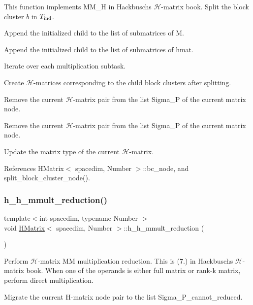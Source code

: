 This function implements {\ttfamily M\+M\+\_\+H} in Hackbusch\textquotesingle{}s $\mathcal{H}$-\/matrix book. Split the block cluster $b$ in $T_{\rm ind}$.

Append the initialized child to the list of submatrices of {\ttfamily M}.

Append the initialized child to the list of submatrices of {\ttfamily hmat}.

Iterate over each multiplication subtask.

Create $\mathcal{H}$-\/matrices corresponding to the child block clusters after splitting.

Remove the current $\mathcal{H}$-\/matrix pair from the list {\ttfamily Sigma\+\_\+P} of the current matrix node.

Remove the current $\mathcal{H}$-\/matrix pair from the list {\ttfamily Sigma\+\_\+P} of the current matrix node.

Update the matrix type of the current $\mathcal{H}$-\/matrix.

References H\+Matrix$<$ spacedim, Number $>$\+::bc\+\_\+node, and split\+\_\+block\+\_\+cluster\+\_\+node().

\mbox{\label{classHMatrix_a168b6eea2e5b27528497850bf5ee2bbe}} 
\subsubsection{\texorpdfstring{h\+\_\+h\+\_\+mmult\+\_\+reduction()}{h\_h\_mmult\_reduction()}}
{\footnotesize\ttfamily template$<$int spacedim, typename Number $>$ \\
void \hyperlink{classHMatrix}{H\+Matrix}$<$ spacedim, Number $>$\+::h\+\_\+h\+\_\+mmult\+\_\+reduction (\begin{DoxyParamCaption}{ }\end{DoxyParamCaption})}

Perform $\mathcal{H}$-\/matrix MM multiplication reduction. This is (7.) in Hackbusch\textquotesingle{}s $\mathcal{H}$-\/matrix book. When one of the operands is either full matrix or rank-\/k matrix, perform direct multiplication.

Migrate the current H-\/matrix node pair to the list {\ttfamily Sigma\+\_\+\+P\+\_\+cannot\+\_\+reduced}.

